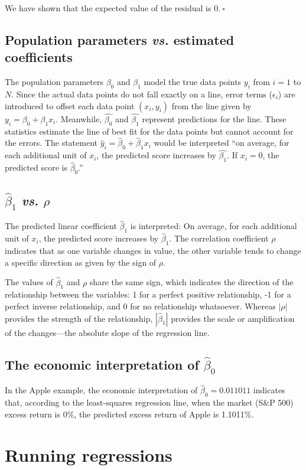 \documentclass[12pt]{article}
\begin{document}
We have shown that the expected value of the residual is 0.$~\square$
\subsection{Population parameters \textit{vs.} estimated coefficients}
The population parameters $\beta_0$ and $\beta_1$ model the true data points $y_i$ from $i=1$ to $N$. Since the actual data points do not fall exactly on a line, error terms ($\epsilon_i$) are introduced to offset each data point $(x_i,y_i)$ from the line given by $y_i=\beta_0+\beta_1x_i$. Meanwhile, $\hat{\beta_0}$ and $\hat{\beta_1}$ represent predictions for the line. These statistics estimate the line of best fit for the data points but cannot account for the errors. The statement $\hat{y}_i=\hat{\beta}_0+\hat{\beta}_1x_i$ would be interpreted ``on average, for each additional unit of $x_i$, the predicted score increases by $\hat{\beta_1}$. If $x_i=0$, the predicted score is $\hat{\beta}_0$.''
\subsection{$\hat{\beta}_1$ \textit{vs.} $\rho$}
The predicted linear coefficient $\hat{\beta}_1$ is interpreted: On average, for each additional unit of $x_i$, the predicted score increases by $\hat{\beta}_1$. The correlation coefficient $\rho$ indicates that as one variable changes in value, the other variable tends to change a specific direction as given by the sign of $\rho$.

The values of $\hat{\beta}_1$ and $\rho$ share the same sign, which indicates the direction of the relationship between the variables: 1 for a perfect positive relationship, -1 for a perfect inverse relationship, and 0 for no relationship whatsoever. Whereas $|\rho|$ provides the strength of the relationship, $\left|\hat{\beta}_1\right|$ provides the scale or amplification of the changes---the absolute slope of the regression line.
\subsection{The economic interpretation of $\hat{\beta}_0$}
In the Apple example, the economic interpretation of $\hat{\beta}_0=0.011011$ indicates that, according to the least-squares regression line, when the market (S\&P 500) excess return is 0\%, the predicted excess return of Apple is 1.1011\%.
\section{Running regressions}
\end{document}
